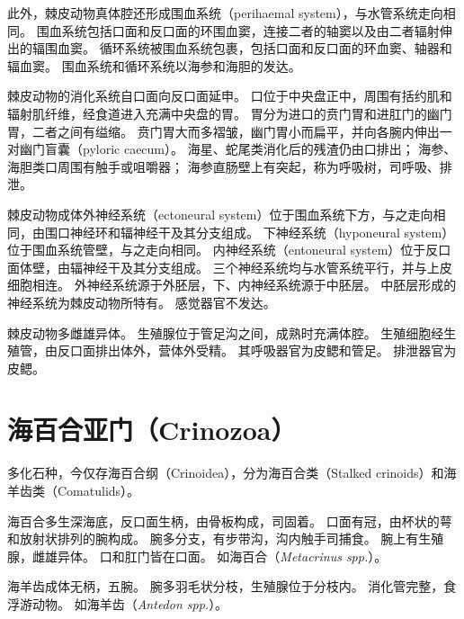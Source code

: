 \documentclass[11pt]{article}
\begin{document}
\newline

此外，棘皮动物真体腔还形成围血系统（perihaemal system），与水管系统走向相同。
围血系统包括口面和反口面的环围血窦，连接二者的轴窦以及由二者辐射伸出的辐围血窦。
循环系统被围血系统包裹，包括口面和反口面的环血窦、轴器和辐血窦。
围血系统和循环系统以海参和海胆的发达。

\newline

棘皮动物的消化系统自口面向反口面延申。
口位于中央盘正中，周围有括约肌和辐射肌纤维，经食道进入充满中央盘的胃。
胃分为进口的贲门胃和进肛门的幽门胃，二者之间有缢缩。
贲门胃大而多褶皱，幽门胃小而扁平，并向各腕内伸出一对幽门盲囊（pyloric caecum）。
海星、蛇尾类消化后的残渣仍由口排出；
海参、海胆类口周围有触手或咀嚼器；
海参直肠壁上有突起，称为呼吸树，司呼吸、排泄。

\newline

棘皮动物成体外神经系统（ectoneural system）位于围血系统下方，与之走向相同，由围口神经环和辐神经干及其分支组成。
下神经系统（hyponeural system）位于围血系统管壁，与之走向相同。
内神经系统（entoneural system）位于反口面体壁，由辐神经干及其分支组成。
三个神经系统均与水管系统平行，并与上皮细胞相连。
外神经系统源于外胚层，下、内神经系统源于中胚层。
中胚层形成的神经系统为棘皮动物所特有。
感觉器官不发达。

\newline

棘皮动物多雌雄异体。
生殖腺位于管足沟之间，成熟时充满体腔。
生殖细胞经生殖管，由反口面排出体外，营体外受精。
其呼吸器官为皮鳃和管足。
排泄器官为皮鳃。
  
\section{海百合亚门（Crinozoa）}
多化石种，今仅存海百合纲（Crinoidea），分为海百合类（Stalked crinoids）和海羊齿类（Comatulids）。

\newline

海百合多生深海底，反口面生柄，由骨板构成，司固着。
口面有冠，由杯状的萼和放射状排列的腕构成。
腕多分支，有步带沟，沟内触手司捕食。
腕上有生殖腺，雌雄异体。
口和肛门皆在口面。
如海百合（\textit{Metacrinus spp.}）。

\newline

海羊齿成体无柄，五腕。
腕多羽毛状分枝，生殖腺位于分枝内。
消化管完整，食浮游动物。
如海羊齿（\textit{Antedon spp.}）。
\end{document}
